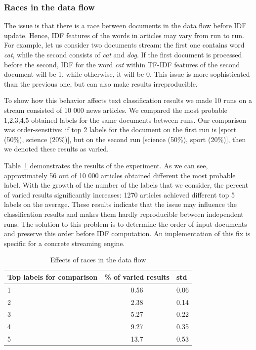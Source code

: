 \subsubsection{Races in the data flow}
The issue is that there is a race between documents in the data flow before IDF update. Hence, IDF features of the words in articles may vary from run to run. For example, let us consider two documents stream: the first one contains word {\em cat}, while the second consists of {\em cat} and {\em dog}. If the first document is processed before the second, IDF for the word {\em cat} within TF-IDF features of the second document will be 1, while otherwise, it will be 0. This issue is more sophisticated than the previous one, but can also make results irreproducible. 

To show how this behavior affects text classification results we made 10 runs on a stream consisted of 10 000 news articles. We compared the most probable 1,2,3,4,5 obtained labels for the same documents between runs. Our comparison was order-sensitive: if top 2 labels for the document on the first run is [sport (50\%), science (20\%)], but on the second run [science (50\%), sport (20\%)], then we denoted these results as varied. 

Table~\ref{race_table} demonstrates the results of the experiment. As we can see, approximately 56 out of 10 000 articles obtained different the most probable label. With the growth of the number of the labels that we consider, the percent of varied results significantly increases: 1270 articles achieved different top 5 labels on the average. These results indicate that the issue may influence the classification results and makes them hardly reproducible between independent runs. The solution to this problem is to determine the order of input documents and preserve this order before IDF computation. An implementation of this fix is specific for a concrete streaming engine.

\begin{table}[htbp]
\caption{Effects of races in the data flow}
\begin{threeparttable}
\begin{tabular}{lcl}
Top labels for comparison    & \% of varied results & std    \\
\hline
1   &   0.56    &   0.06    \\
2   &   2.38    &   0.14    \\
3   &   5.27    &   0.22    \\
4   &   9.27    &   0.35    \\
5   &   13.7    &   0.53    \\
\end{tabular}
\end{threeparttable}
\label{race_table}
\end{table}

